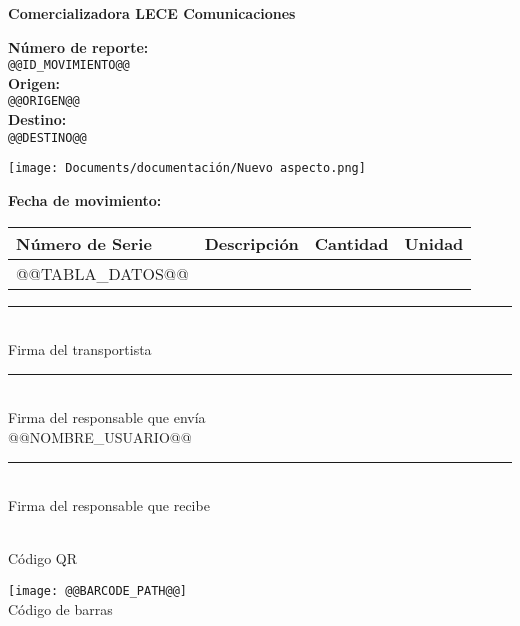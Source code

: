 \documentclass[12pt, a4paper]{article}
\begin{document}
\centering
{\LARGE \textbf{Comercializadora LECE Comunicaciones}}

\vspace{1cm}

\begin{minipage}{0.5\textwidth}
  \raggedright
  \textbf{Número de reporte:} \\
  \texttt{@@ID_MOVIMIENTO@@} \\[0.5cm]
  \textbf{Origen:} \\
  \texttt{@@ORIGEN@@} \\[0.5cm]
  \textbf{Destino:} \\
  \texttt{@@DESTINO@@} \\
\end{minipage}%
\begin{minipage}{0.5\textwidth}
  \raggedleft
  \texttt{[image: Documents/documentación/Nuevo aspecto.png]}
\end{minipage}

\vspace{1cm}

\textbf{Fecha de movimiento:} \\
\texttt{} 

\vspace{1cm}

\begin{tabularx}{\textwidth}{@{}| l |Y |r |r| @{}}
  \hline
  \textbf{Número de Serie} & \textbf{Descripción} & \textbf{Cantidad} & \textbf{Unidad} \\
  \hline
  \midrule
  @@TABLA_DATOS@@
  \bottomrule
  \hline
\end{tabularx}

\vfill

\begin{minipage}[t]{0.3\textwidth}
  \centering
  \rule{6cm}{1pt}\\
  Firma del transportista
\end{minipage}%
\begin{minipage}[t]{0.3\textwidth}
  \centering
  \rule{6cm}{1pt}\\
  Firma del responsable que envía \\
  @@NOMBRE_USUARIO@@
\end{minipage}%
\begin{minipage}[t]{0.3\textwidth}
  \centering
  \rule{6cm}{1pt}\\
  Firma del responsable que recibe
\end{minipage}

\vspace{2cm}

\begin{minipage}{0.5\textwidth}
  \centering
   \\
  Código QR
\end{minipage}%
\begin{minipage}{0.5\textwidth}
  \centering
  \texttt{[image: @@BARCODE\_PATH@@]} \\
  Código de barras
\end{minipage}
\end{document}
